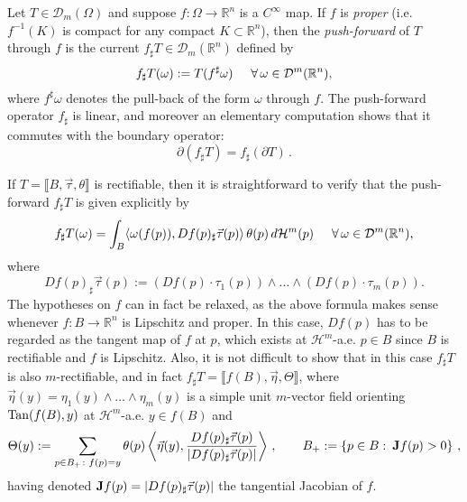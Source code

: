 \documentclass[a4paper,11pt,reqno]{amsart}
\theoremstyle{definition}
\numberwithin{equation}{section}
\numberwithin{subsection}{section}
\newcommand{\R}{\mathbb{R}}
\newcommand{\D}{\mathcal{D}}
\newcommand{\Ha}{\mathcal{H}}
\begin{document}
Let $T \in \D_{m}(\Omega)$ and suppose $f \colon \Omega \to \R^{n}$ is a $C^{\infty}$ map. If $f$ is \emph{proper} (i.e. $f^{-1}(K)$ is compact for any compact $K \subset \R^{n}$), then the \emph{push-forward} of $T$ through $f$ is the current $f_{\sharp}T \in \D_{m}(\R^{n})$ defined by
\[
f_{\sharp}T(\omega) := T(f^{\sharp}\omega) \hspace{0.5cm} \forall \, \omega \in \D^{m}(\R^{n}),
\] 
where $f^{\sharp}\omega$ denotes the pull-back of the form $\omega$ through $f$. The push-forward operator $f_{\sharp}$ is linear, and moreover an elementary computation shows that it commutes with the boundary operator:
\[
\partial(f_{\sharp} T) = f_{\sharp}(\partial T)\,.
\]

\medskip

If $T = \llbracket B, \vec{\tau}, \theta \rrbracket$ is rectifiable, then it is straightforward to verify that the push-forward $f_{\sharp}T$ is given explicitly by
\[
f_{\sharp}T(\omega) = \int_{B} \langle \omega(f(p)), Df(p)_{\sharp}\vec{\tau}(p) \rangle \, \theta(p) \, d\Ha^{m}(p) \hspace{0.5cm} \forall \, \omega \in \D^{m}(\R^{n}), 
\]
where 
\[
Df(p)_{\sharp}\vec{\tau}(p) := (Df(p) \cdot \tau_{1}(p)) \wedge \dots \wedge (Df(p) \cdot \tau_{m}(p)).
\]
The hypotheses on $f$ can in fact be relaxed, as the above formula makes sense whenever $f \colon B \to \R^{n}$ is Lipschitz and proper. In this case, $Df(p)$ has to be regarded as the tangent map of $f$ at $p$, which exists at $\Ha^{m}$-a.e. $p \in B$ since $B$ is rectifiable and $f$ is Lipschitz. Also, it is not difficult to show that in this case $f_{\sharp}T$ is also $m$-rectifiable, and in fact $f_{\sharp}T = \llbracket f(B), \vec{\eta}, \Theta \rrbracket$, where $\vec{\eta}(y) = \eta_1(y) \wedge \dots \wedge \eta_m(y)$ is a simple unit $m$-vector field orienting ${\rm Tan}(f(B),y)$ at $\Ha^m$-a.e. $y \in f(B)$ and
\[
\Theta(y) := \sum_{p \in B_{+} \colon f(p) = y} \theta(p) \left\langle \vec{\eta}(y), \frac{Df(p)_{\sharp}\vec{\tau}(p)}{|Df(p)_{\sharp}\vec{\tau}(p)|} \right\rangle\,, \qquad B_+ := \left\lbrace p \in B \, \colon \, {\bf J}f(p) > 0 \right\rbrace\,,
\]
having denoted ${\bf J}f(p) = |Df(p)_{\sharp}\vec{\tau}(p)|$ the tangential Jacobian of $f$.
\end{document}
